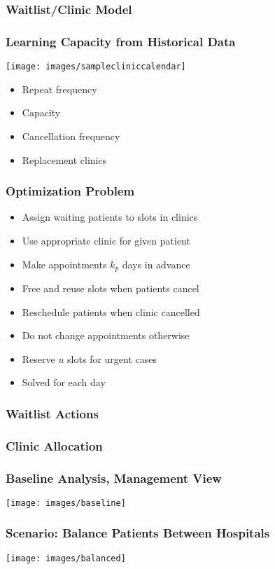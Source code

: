 \documentclass[dvipsnames]{beamer}
\begin{document}
\begin{frame}
\frametitle{Waitlist/Clinic Model}

\end{frame}


\begin{frame}
\frametitle{Learning Capacity from Historical Data}
\texttt{[image: images/samplecliniccalendar]}
{\small
\begin{itemize}
\item Repeat frequency
\item Capacity
\item Cancellation frequency
\item Replacement clinics
\end{itemize}
}
\end{frame}

\begin{frame}
\frametitle{Optimization Problem}
\begin{itemize}
\item Assign waiting patients to slots in clinics
\item Use appropriate clinic for given patient
\item Make appointments $k_p$ days in advance
\item Free and reuse slots when patients cancel
\item Reschedule patients when clinic cancelled
\item Do not change appointments otherwise
\item Reserve $u$ slots for urgent cases
\item Solved for each day
\end{itemize}
\end{frame}

\begin{frame}
\frametitle{Waitlist Actions}

\end{frame}

\begin{frame}
\frametitle{Clinic Allocation}

\end{frame}

\begin{frame}
\frametitle{Baseline Analysis, Management View}
\texttt{[image: images/baseline]}
\end{frame}

\begin{frame}
\frametitle{Scenario: Balance Patients Between Hospitals}
\texttt{[image: images/balanced]}
\end{frame}
\end{document}
